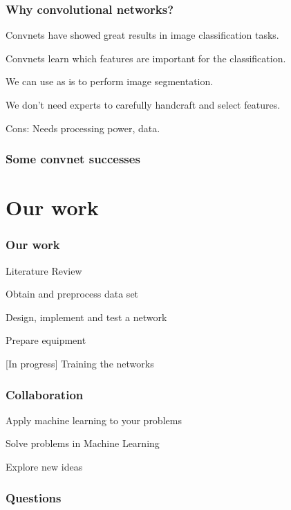 \documentclass[12pt]{beamer}
\begin{document}
	\begin{frame}
		\frametitle{Why convolutional networks?}
		Convnets have showed great results in image classification tasks.
		
		Convnets learn which features are important for the classification.
		
		We can use as is to perform image segmentation.

		We don’t need experts to carefully handcraft and select features.


		Cons: Needs processing power, data.
	\end{frame}
	
	\begin{frame}
		\frametitle{Some convnet successes}
	\end{frame}	
	
	\section{Our work}
	\begin{frame}
		\frametitle{Our work}
		Literature Review

		Obtain and preprocess data set
		
		Design, implement and test a network
		
		Prepare equipment
	
		[In progress] Training the networks
	\end{frame}
	
	\begin{frame}
		\frametitle{Collaboration}
		Apply machine learning to your problems
		
		Solve problems in Machine Learning
		
		Explore new ideas
	\end{frame}
	
	\begin{frame}
		\frametitle{Questions}
		
	\end{frame}
\end{document}
